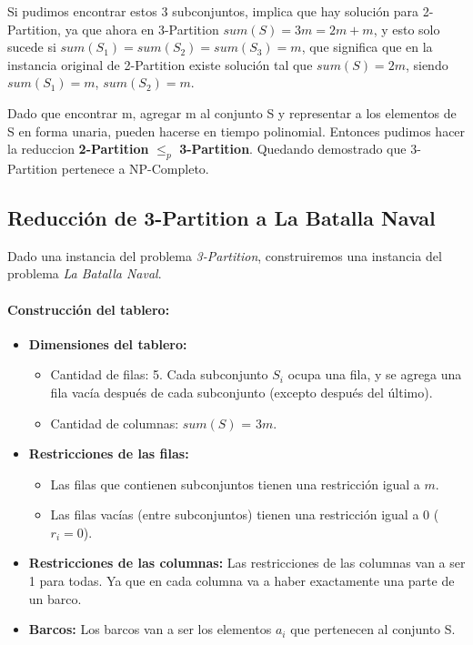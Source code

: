 Si pudimos encontrar estos 3 subconjuntos, implica que hay solución para 2-Partition, ya que ahora en 3-Partition $sum(S) = 3m = 2m + m$, y esto solo sucede si $sum(S_1) = sum(S_2) = sum(S_3) = m$, que significa que en la instancia original de 2-Partition existe solución tal que $sum(S) = 2m$, siendo $sum(S_1) = m$, $sum(S_2) = m$.

Dado que encontrar m, agregar m al conjunto S y representar a los elementos de S en forma unaria, pueden hacerse en tiempo polinomial. Entonces pudimos hacer la reduccion \textbf{2-Partition} $\leq_p$ \textbf{3-Partition}. Quedando demostrado que 3-Partition pertenece a NP-Completo.


\subsection*{Reducción de 3-Partition a La Batalla Naval}

Dado una instancia del problema \textit{3-Partition}, construiremos una instancia del problema \textit{La Batalla Naval}.

\paragraph{Construcción del tablero:}

\begin{itemize}
    \item \textbf{Dimensiones del tablero:} %
    \begin{itemize}
        \item Cantidad de filas: 5. Cada subconjunto \(S_i\) ocupa una fila, y se agrega una fila vacía después de cada subconjunto (excepto después del último).
        \item Cantidad de columnas: $sum(S)$ = \(3m\). %
    \end{itemize}

    \item \textbf{Restricciones de las filas:}
    \begin{itemize}
        \item Las filas que contienen subconjuntos tienen una restricción igual a $m$.
        \item Las filas vacías (entre subconjuntos) tienen una restricción igual a 0 (\(r_i = 0\)).
    \end{itemize}

    \item \textbf{Restricciones de las columnas:} Las restricciones de las columnas van a ser 1 para todas. Ya que en cada columna va a haber exactamente una parte de un barco.

    \item \textbf{Barcos:} Los barcos van a ser los elementos $a_i$ que pertenecen al conjunto S.
\end{itemize}

